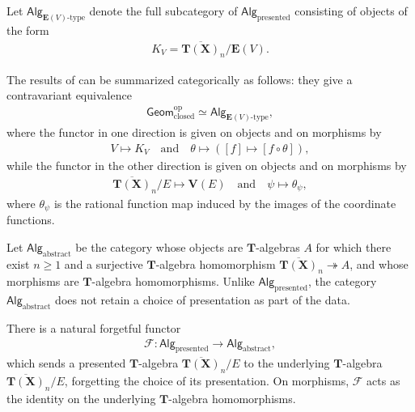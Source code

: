 \documentclass[a4paper,12pt]{amsart}
\theoremstyle{plain}
\theoremstyle{definition}
\begin{document}
Let $\mathsf{Alg}_{\boldsymbol{E}(V)\text{-type}}$ denote the full subcategory of $\mathsf{Alg}_{\mathrm{presented}}$ consisting of objects of the form
\begin{align*}
K_V = \overline{\boldsymbol{T}(\boldsymbol{X})}_n / \boldsymbol{E}(V).
\end{align*}

\smallskip

The results of \cite[Theorem 3.14, Lemma 3.18, Corollary 3.19, and Proposition 3.20]{JuAe5} can be summarized categorically as follows:
they give a contravariant equivalence
\begin{align*}
\mathsf{Geom}_{\mathrm{closed}}^{\mathrm{op}} \simeq \mathsf{Alg}_{\boldsymbol{E}(V)\text{-type}},
\end{align*}
where the functor in one direction is given on objects and on morphisms by
\begin{align*}
V \mapsto K_V \quad \text{and} \quad \theta \mapsto ( [f] \mapsto [f \circ \theta] ),
\end{align*}
while the functor in the other direction is given on objects and on morphisms by
\begin{align*}
\overline{\boldsymbol{T}(\boldsymbol{X})}_n / E \mapsto \boldsymbol{V}(E) \quad \text{and} \quad \psi \mapsto \theta_{\psi},
\end{align*}
where $\theta_{\psi}$ is the rational function map induced by the images of the coordinate functions.

\smallskip

Let $\mathsf{Alg}_{\mathrm{abstract}}$ be the category whose objects are $\boldsymbol{T}$-algebras $A$ for which there exist $n \ge 1$ and a surjective $\boldsymbol{T}$-algebra homomorphism $\overline{\boldsymbol{T}(\boldsymbol{X})}_n \twoheadrightarrow A$, and whose morphisms are $\boldsymbol{T}$-algebra homomorphisms.
Unlike $\mathsf{Alg}_{\mathrm{presented}}$, the category $\mathsf{Alg}_{\mathrm{abstract}}$ does not retain a choice of presentation as part of the data.

There is a natural forgetful functor
\begin{align*}
\mathcal{F} : \mathsf{Alg}_{\mathrm{presented}} \to \mathsf{Alg}_{\mathrm{abstract}},
\end{align*}
which sends a presented $\boldsymbol{T}$-algebra $\overline{\boldsymbol{T}(\boldsymbol{X})}_n/E$ to the underlying $\boldsymbol{T}$-algebra $\overline{\boldsymbol{T}(\boldsymbol{X})}_n/E$, forgetting the choice of its presentation.
On morphisms, $\mathcal{F}$ acts as the identity on the underlying $\boldsymbol{T}$-algebra homomorphisms.
\end{document}
